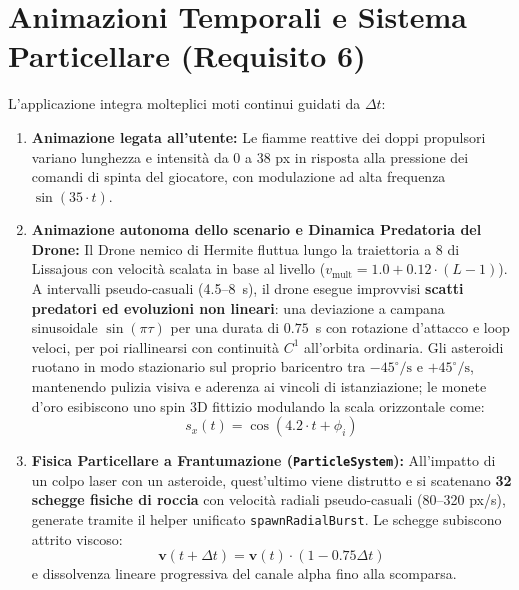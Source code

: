 \documentclass[11pt,a4paper]{article}
\begin{document}
\section{Animazioni Temporali e Sistema Particellare (Requisito 6)}

L'applicazione integra molteplici moti continui guidati da $\Delta t$:
\begin{enumerate}
    \item \textbf{Animazione legata all'utente:} Le fiamme reattive dei doppi propulsori variano lunghezza e intensità da 0 a 38 px in risposta alla pressione dei comandi di spinta del giocatore, con modulazione ad alta frequenza $\sin(35 \cdot t)$.
    \item \textbf{Animazione autonoma dello scenario e Dinamica Predatoria del Drone:} Il Drone nemico di Hermite fluttua lungo la traiettoria a 8 di Lissajous con velocità scalata in base al livello ($v_{\text{mult}} = 1.0 + 0.12 \cdot (L - 1)$). A intervalli pseudo-casuali (4.5--8~s), il drone esegue improvvisi \textbf{scatti predatori ed evoluzioni non lineari}: una deviazione a campana sinusoidale $\sin(\pi \tau)$ per una durata di $0.75$~s con rotazione d'attacco e loop veloci, per poi riallinearsi con continuità $C^1$ all'orbita ordinaria. Gli asteroidi ruotano in modo stazionario sul proprio baricentro tra $-45^\circ/\text{s}$ e $+45^\circ/\text{s}$, mantenendo pulizia visiva e aderenza ai vincoli di istanziazione; le monete d'oro esibiscono uno spin 3D fittizio modulando la scala orizzontale come:
    \begin{equation}
    s_x(t) = \cos(4.2 \cdot t + \phi_i)
    \end{equation}
    \item \textbf{Fisica Particellare a Frantumazione (\texttt{ParticleSystem}):} All'impatto di un colpo laser con un asteroide, quest'ultimo viene distrutto e si scatenano \textbf{32 schegge fisiche di roccia} con velocità radiali pseudo-casuali (80--320 px/s), generate tramite il helper unificato \texttt{spawnRadialBurst}. Le schegge subiscono attrito viscoso:
    \begin{equation}
    \mathbf{v}(t + \Delta t) = \mathbf{v}(t) \cdot (1 - 0.75 \Delta t)
    \end{equation}
    e dissolvenza lineare progressiva del canale alpha fino alla scomparsa.
\end{enumerate}
\end{document}
